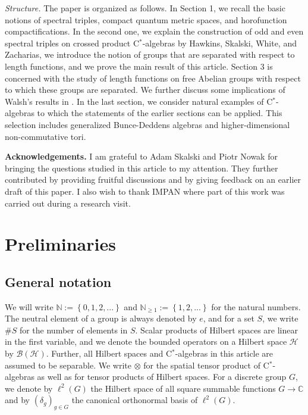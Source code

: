 \documentclass[a4paper,11pt,reqno]{amsart}
\numberwithin{equation}{section}
\numberwithin{equation}{section}
\theoremstyle{definition}
\theoremstyle{remark}
\theoremstyle{remark}
\begin{document}
\noindent \emph{Structure.} The paper is organized as follows. In Section 1, we recall the basic
notions of spectral triples, compact quantum metric spaces, and horofunction
compactifications. In the second one, we explain the construction of
odd and even spectral triples on crossed product C$^{\ast}$-algebras
by Hawkins, Skalski, White, and Zacharias, we introduce the notion of
groups that are separated with respect to length functions, and we prove
the main result of this article. Section 3 is concerned with the
study of length functions on free Abelian groups with respect to which
these groups are separated. We further discuss some implications of
Walsh's results in \cite{Walsh07}. In the last section, we consider
natural examples of C$^{\ast}$-algebras to which the statements of
the earlier sections can be applied. This selection includes generalized
Bunce-Deddens algebras and higher-dimensional non-commutative tori. \\

\vspace{3mm}


\noindent \textbf{Acknowledgements.} I am grateful to Adam Skalski and Piotr Nowak for bringing the questions studied in this article to my attention. They further contributed by providing fruitful discussions and by giving feedback on an earlier draft of this paper. I also wish to thank IMPAN where part of this work was carried out during a research visit.

\vspace{5mm}


\section{Preliminaries}

\vspace{3mm}

\subsection{General notation}

We will write $\mathbb{N}:=\left\{ 0,1,2,...\right\} $ and $\mathbb{N}_{\geq1}:=\left\{ 1,2,...\right\} $
for the natural numbers. The neutral element of a group is always
denoted by $e$, and for a set $S$, we write $\#S$ for the number
of elements in $S$. Scalar products of Hilbert spaces are linear
in the first variable, and we denote the bounded operators on a Hilbert
space $\mathcal{H}$ by $\mathcal{B}(\mathcal{H})$. Further, all
Hilbert spaces and C$^{\ast}$-algebras in this article are assumed
to be separable. We write $\otimes$ for the spatial tensor product
of C$^{\ast}$-algebras as well as for tensor products of Hilbert
spaces. For a discrete group $G$, we denote by $\ell^{2}(G)$ the
Hilbert space of all square summable functions $G\rightarrow\mathbb{C}$
and by $(\delta_{g})_{g\in G}$ the canonical orthonormal basis of
$\ell^2(G)$.
\end{document}
